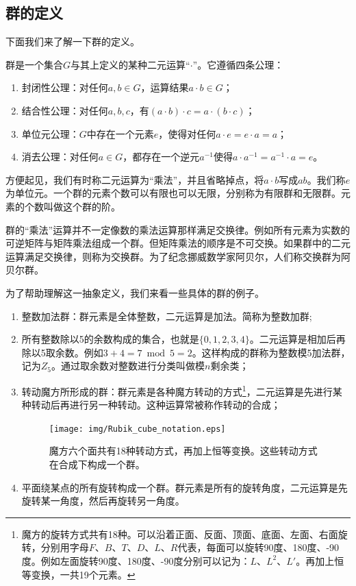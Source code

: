 \documentclass{article}
\begin{document}
\subsection{群的定义}

下面我们来了解一下群的定义。

\begin{definition}群是一个集合$G$与其上定义的某种二元运算“$\cdot$”。它遵循四条公理：
\begin{enumerate}
\item 封闭性公理：对任何$a, b \in G$，运算结果$a \cdot b \in G$；
\item 结合性公理：对任何$a, b, c$，有$(a \cdot b) \cdot c = a \cdot (b \cdot c)$；
\item 单位元公理：$G$中存在一个元素$e$，使得对任何$a \cdot e = e \cdot a = a$；
\item 消去公理：对任何$a \in G$，都存在一个逆元$a^{-1}$使得$a \cdot a^{-1} = a^{-1} \cdot a = e$。
\end{enumerate}
\end{definition}

方便起见，我们有时称二元运算为“乘法”，并且省略掉点，将$a \cdot b$写成$ab$。我们称$e$为单位元。一个群的元素个数可以有限也可以无限，分别称为有限群和无限群。元素的个数叫做这个群的阶。

群的“乘法”运算并不一定像数的乘法运算那样满足交换律。例如所有元素为实数的可逆矩阵与矩阵乘法组成一个群。但矩阵乘法的顺序是不可交换。如果群中的二元运算满足交换律，则称为交换群。为了纪念挪威数学家阿贝尔，人们称交换群为阿贝尔群。

为了帮助理解这一抽象定义，我们来看一些具体的群的例子。

\begin{enumerate}
\item 整数加法群：群元素是全体整数，二元运算是加法。简称为整数加群;
\item 所有整数除以5的余数构成的集合，也就是$\{0, 1, 2, 3, 4\}$。二元运算是相加后再除以5取余数。例如$3 + 4 = 7 \bmod 5 = 2$。这样构成的群称为整数模5加法群，记为$Z_5$。通过取余数对整数进行分类叫做模$n$剩余类；
\item 转动魔方所形成的群：群元素是各种魔方转动的方式\footnote{魔方的旋转方式共有18种。可以沿着正面、反面、顶面、底面、左面、右面旋转，分别用字母$F$、$B$、$T$、$D$、$L$、$R$代表，每面可以旋转90度、180度、-90度。例如左面旋转90度、180度、-90度分别可以记为：$L$、$L^2$、$L'$\cite{Wiki-Rubik-Cube-group}。再加上恒等变换，一共19个元素。}，二元运算是先进行某种转动后再进行另一种转动。这种运算常被称作转动的合成；

\begin{figure}[htbp]
 \centering
 \texttt{[image: img/Rubik\_cube\_notation.eps]}
 \caption{魔方六个面共有18种转动方式，再加上恒等变换。这些转动方式在合成下构成一个群。}
 \label{fig:Rubik-cube-notation}
\end{figure}

\item 平面绕某点的所有旋转构成一个群。群元素是所有的旋转角度，二元运算是先旋转某一角度，然后再旋转另一角度。
\end{enumerate}
\end{document}
